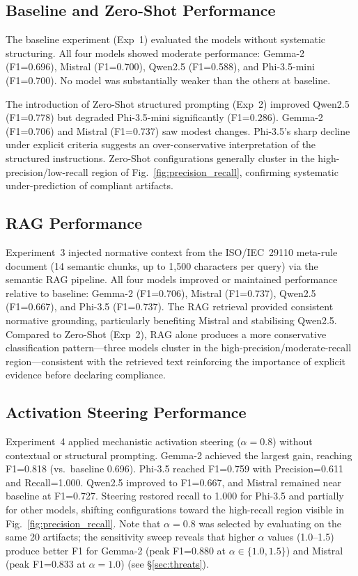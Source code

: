 \documentclass{ieeeaccess}
\begin{document}
\subsection{Baseline and Zero-Shot Performance}

The baseline experiment (Exp~1) evaluated the models without systematic structuring. All four models showed moderate performance: Gemma-2 (F1=0.696), Mistral (F1=0.700), Qwen2.5 (F1=0.588), and Phi-3.5-mini (F1=0.700). No model was substantially weaker than the others at baseline.

The introduction of Zero-Shot structured prompting (Exp~2) improved Qwen2.5 (F1=0.778) but degraded Phi-3.5-mini significantly (F1=0.286). Gemma-2 (F1=0.706) and Mistral (F1=0.737) saw modest changes. Phi-3.5's sharp decline under explicit criteria suggests an over-conservative interpretation of the structured instructions. Zero-Shot configurations generally cluster in the high-precision/low-recall region of Fig.~\ref{fig:precision_recall}, confirming systematic under-prediction of compliant artifacts.

\subsection{RAG Performance}

Experiment~3 injected normative context from the ISO/IEC~29110 meta-rule document (14 semantic chunks, up to 1,500 characters per query) via the semantic RAG pipeline. All four models improved or maintained performance relative to baseline: Gemma-2 (F1=0.706), Mistral (F1=0.737), Qwen2.5 (F1=0.667), and Phi-3.5 (F1=0.737). The RAG retrieval provided consistent normative grounding, particularly benefiting Mistral and stabilising Qwen2.5. Compared to Zero-Shot (Exp~2), RAG alone produces a more conservative classification pattern---three models cluster in the high-precision/moderate-recall region---consistent with the retrieved text reinforcing the importance of explicit evidence before declaring compliance.

\subsection{Activation Steering Performance}

Experiment~4 applied mechanistic activation steering ($\alpha=0.8$) without contextual or structural prompting. Gemma-2 achieved the largest gain, reaching F1=0.818 (vs.\ baseline 0.696). Phi-3.5 reached F1=0.759 with Precision=0.611 and Recall=1.000. Qwen2.5 improved to F1=0.667, and Mistral remained near baseline at F1=0.727. Steering restored recall to 1.000 for Phi-3.5 and partially for other models, shifting configurations toward the high-recall region visible in Fig.~\ref{fig:precision_recall}. Note that $\alpha=0.8$ was selected by evaluating on the same 20 artifacts; the sensitivity sweep reveals that higher $\alpha$ values (1.0--1.5) produce better F1 for Gemma-2 (peak F1=0.880 at $\alpha\in\{1.0,1.5\}$) and Mistral (peak F1=0.833 at $\alpha=1.0$) (see §\ref{sec:threats}).
\end{document}
